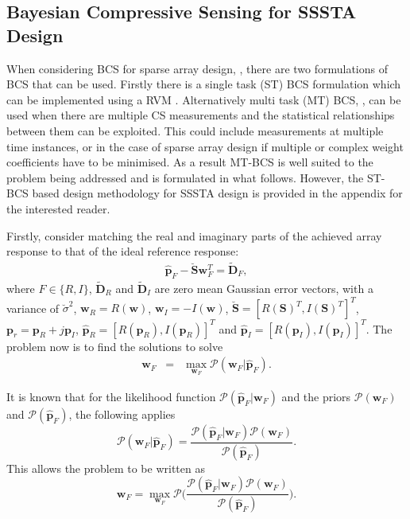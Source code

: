 \documentclass[10pt,final]{IEEEtran}
\begin{document}
\subsection{Bayesian Compressive Sensing for SSSTA Design}\label{sub:BCS}
When considering BCS for sparse array design, \cite{Oliveri11a,Oliveri12,Viani13,Oliveri12a}, there are two formulations of BCS that can be used.  Firstly there is a single task (ST) BCS formulation \cite{Ji08} which can be implemented using a RVM \cite{Tipping01,Tipping03}.  Alternatively multi task (MT) BCS, \cite{Ji09}, can be used when there are multiple CS measurements and the statistical relationships between them can be exploited.  This could include measurements at multiple time instances, or in the case of sparse array design if multiple or complex weight coefficients have to be minimised.  As a result MT-BCS is well suited to the problem being addressed and is formulated in what follows.  However, the ST-BCS based design methodology for SSSTA design is provided in the appendix for the interested reader.

Firstly, consider matching the real and imaginary parts of the achieved array response to that of the ideal reference response:
\begin{eqnarray}\label{eq:mtbcs1}
  \hat{\textbf{p}}_{F}-\breve{\textbf{S}}\textbf{w}_{F}^{T} = \tilde{\textbf{D}}_{F},
\end{eqnarray}
where $F\in\{R,I\}$, $\tilde{\textbf{D}}_{R}$ and $\tilde{\textbf{D}}_{I}$ are zero mean Gaussian error vectors, with a variance of $\breve{\sigma}^{2}$, $\textbf{w}_{R}=R(\textbf{w})$, $\textbf{w}_{I}=-I(\textbf{w})$, $\breve{\textbf{S}}=[R(\textbf{S})^{T},I(\textbf{S})^{T}]^{T}$, $\textbf{p}_{r}=\textbf{p}_{R}+j\textbf{p}_{I}$, $\hat{\textbf{p}}_{R}=[R(\textbf{p}_{R}),I(\textbf{p}_{R})]^{T}$ and $\hat{\textbf{p}}_{I}=[R(\textbf{p}_{I}),I(\textbf{p}_{I})]^{T}$.  The problem now is to find the solutions to solve
\begin{eqnarray}\label{eq:mtbcs2}
  \textbf{w}_{F} &=&\max\limits_{\textbf{w}_{F}}\mathcal{P}(\textbf{w}_{F}|\hat{\textbf{p}}_{F}).
\end{eqnarray}


It is known that for the likelihood function $\mathcal{P}(\hat{\textbf{p}}_{F}|\textbf{w}_{F})$ and the priors $\mathcal{P}(\textbf{w}_{F})$ and $\mathcal{P}(\hat{\textbf{p}}_{F})$, the following applies
\begin{equation}\label{eq:mtbcs3}
  \mathcal{P}(\textbf{w}_{F}|\hat{\textbf{p}}_{F})=\frac{\mathcal{P}(\hat{\textbf{p}}_{F}|\textbf{w}_{F})\mathcal{P}(\textbf{w}_{F})}{\mathcal{P}(\hat{\textbf{p}}_{F})}.
\end{equation}
This allows the problem to be written as
\begin{equation}\label{eq:mtbcs4}
  \textbf{w}_{F} =\max\limits_{\textbf{w}_{F}}\mathcal{P}\Bigg(\frac{\mathcal{P}(\hat{\textbf{p}}_{F}|\textbf{w}_{F})\mathcal{P}(\textbf{w}_{F})}{\mathcal{P}(\hat{\textbf{p}}_{F})} \Bigg).
\end{equation}
\end{document}
